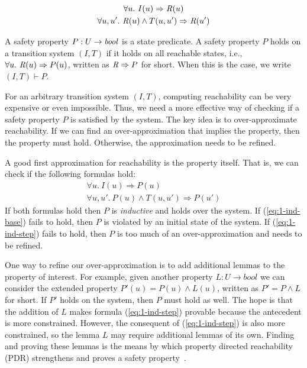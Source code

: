 \begin{gather*}
  \forall u.~ I(u) \Rightarrow \mathit{R}(u) \\
  \forall u, u'.~ \mathit{R}(u) \land T(u, u') \Rightarrow \mathit{R}(u')
\end{gather*}

A safety property $P : U \to \mathit{bool}$ is a state predicate. A safety
property $P$ holds on a transition system $(I, T)$ if it holds on all
reachable states, i.e., $\forall u.~ \mathit{R}(u) \Rightarrow P(u)$,
written as $\mathit{R} \Rightarrow P$ for short. When this is the case, we
write $(I, T)\vdash P$.

For an arbitrary transition system $(I, T)$, computing reachability
can be very expensive or even impossible. Thus, we need a more
effective way of checking if a safety property $P$ is satisfied by the
system. The key idea is to over-approximate reachability. If we can
find an over-approximation that implies the property, then the
property must hold. Otherwise, the approximation needs to be refined.

A good first approximation for reachability is the property itself.
That is, we can check if the following formulas hold:
\begin{gather}
  \forall u.~ I(u) \Rightarrow P(u)
  \label{eq:1-ind-base} \\
  \forall u, u'.~ P(u) \land T(u, u') \Rightarrow P(u')
  \label{eq:1-ind-step}
\end{gather}
If both formulas hold then $P$ is {\em inductive} and holds over the
system. If (\ref{eq:1-ind-base}) fails to hold, then $P$ is violated
by an initial state of the system. If (\ref{eq:1-ind-step}) fails to
hold, then $P$ is too much of an over-approximation and needs to be
refined.

One way to refine our over-approximation is to add additional lemmas
to the property of interest. For example, given another property $L :
U \to bool$ we can consider the extended property $P'(u) = P(u) \land
L(u)$, written as $P' = P \land L$ for short. If $P'$ holds on the
system, then $P$ must hold as well. The hope is that the addition of
$L$ makes formula (\ref{eq:1-ind-step}) provable because the
antecedent is more constrained. However, the consequent of
(\ref{eq:1-ind-step}) is also more constrained, so the lemma $L$ may
require additional lemmas of its own. Finding and proving these
lemmas is the means by which property directed reachability (PDR)
strengthens and proves a safety property~\cite{Een2011:PDR}.

